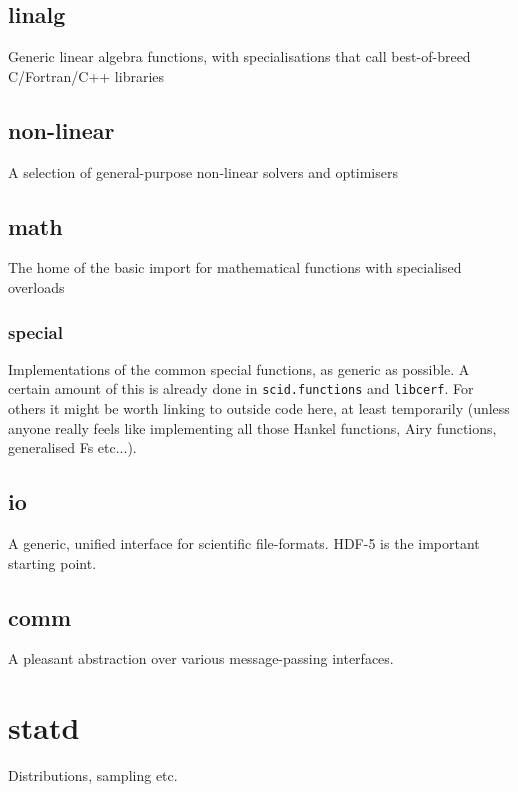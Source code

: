 \documentclass[10pt,a5paper,DIV=13]{scrartcl}
\begin{document}
\subsection{linalg}
Generic linear algebra functions, with specialisations that call best-of-breed C/Fortran/C++ libraries
\subsection{non-linear}
A selection of general-purpose non-linear solvers and optimisers
\subsection{math}
The home of the basic import for mathematical functions with specialised overloads
\subsubsection{special}
Implementations of the common special functions, as generic as possible. A certain amount of this is already done in \texttt{scid.functions} and \texttt{libcerf}. For others it might be worth linking to outside code here, at least temporarily (unless anyone really feels like implementing all those Hankel functions, Airy functions, generalised Fs etc...).
\subsection{io}
A generic, unified interface for scientific file-formats. HDF-5 is the important starting point.
\subsection{comm}
A pleasant abstraction over various message-passing interfaces.

\section{statd}
Distributions, sampling etc.
\end{document}
